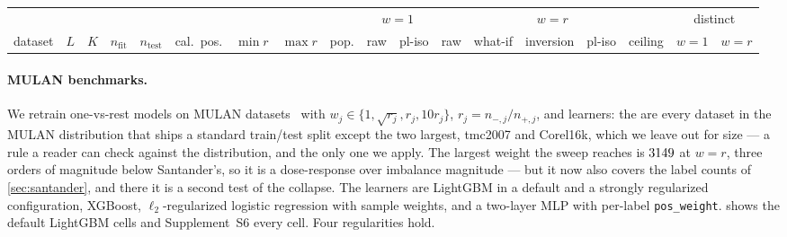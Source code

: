 \documentclass[sigconf,nonacm]{acmart}
\newcommand{\Supp}[1]{Supplement~#1}  %
\begin{document}
\begin{table}[t]
\label{tab:mulan}
\footnotesize
\setlength{\tabcolsep}{3pt}
\begin{tabular}{@{}lrrrrrrrr|cc|ccccc|cc@{}}
\toprule
 & & & & & & & & & \multicolumn{2}{c|}{$w{=}1$} & \multicolumn{5}{c|}{$w{=}r$} & \multicolumn{2}{c}{distinct} \\
dataset & $L$ & $K$ & $n_{\mathrm{fit}}$ & $n_{\mathrm{test}}$ & cal.\ pos. & $\min r$ & $\max r$ & pop. & raw & pl-iso & raw & what-if & inversion & pl-iso & ceiling & $w{=}1$ & $w{=}r$ \\
\midrule

\bottomrule
\end{tabular}
\end{table}

\paragraph{MULAN benchmarks.} We retrain one-vs-rest models on \nnMulan{} MULAN datasets~\cite{Tsoumakas2011MULAN} with $w_j\in\{1,\sqrt{r_j},r_j,10r_j\}$, $r_j=n_{-,j}/n_{+,j}$, and \nnLearners{} learners: the \nnMulan{} are every dataset in the MULAN distribution that ships a standard train/test split except the two largest, tmc2007 and Corel16k, which we leave out for size --- a rule a reader can check against the distribution, and the only one we apply. The largest weight the sweep reaches is $3149$ at $w{=}r$, three orders of magnitude below Santander's, so it is a dose-response over imbalance magnitude --- but it now also covers the label counts of \cref{sec:santander}, and there it is a second test of the collapse. The learners are LightGBM in a default and a strongly regularized configuration, XGBoost, $\ell_2$-regularized logistic regression with sample weights, and a two-layer MLP with per-label \texttt{pos\_weight}.  shows the default LightGBM cells and \Supp{S6} every cell. Four regularities hold.
\end{document}
